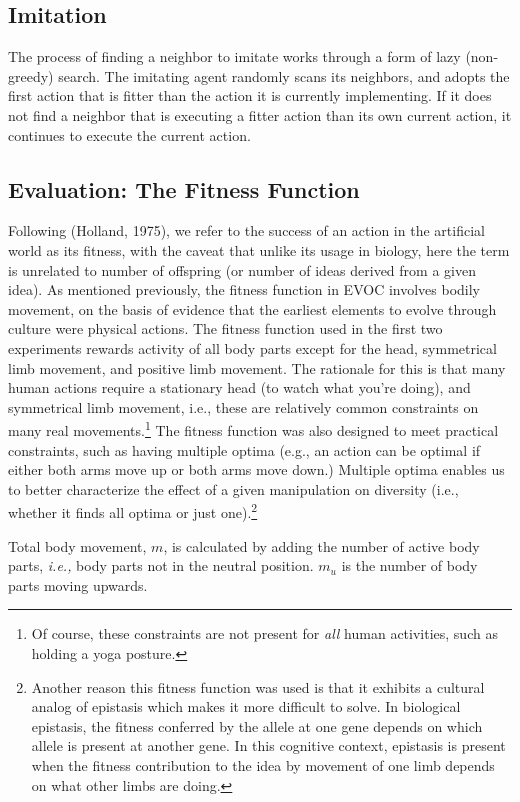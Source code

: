\documentclass[a4paper,12pt,man,british]{apa6}
\begin{document}
\subsection{Imitation}
The process of finding a neighbor to imitate works through a form of lazy (non-greedy) search. The imitating agent randomly scans its neighbors, and adopts the first action that is fitter than the action it is currently implementing. If it does not find a neighbor that is executing a fitter action than its own current action, it continues to execute the current action.

\subsection{Evaluation: The Fitness Function}
Following (Holland, 1975), we refer to the success of an action in the artificial world as its fitness, with the caveat that unlike its usage in biology, here the term is unrelated to number of offspring (or number of ideas derived from a given idea). As mentioned previously, the fitness function in EVOC involves bodily movement, on the basis of evidence that the earliest elements to evolve through culture were physical actions. The fitness function used in the first two experiments rewards activity of all body parts except for the head, symmetrical limb movement, and positive limb movement. The rationale for this is that many human actions require a stationary head (to watch what you're doing), and symmetrical limb movement, i.e., these are relatively common constraints on many real movements.\footnote{Of course, these constraints are not present for {\it all} human activities, such as holding a yoga posture.}
The fitness function was also designed to meet practical constraints, such as having multiple optima (e.g., an action can be optimal if either both arms move up or both arms move down.) Multiple optima enables us to better characterize the effect of a given manipulation on diversity (i.e., whether it finds all optima or just one).\footnote{Another reason this fitness function was used is that it exhibits a cultural analog of epistasis which makes it more difficult to solve. In biological epistasis, the fitness conferred by the allele at one gene depends on which allele is present at another gene. In this cognitive context, epistasis is present when the fitness contribution to the idea by movement of one limb depends on what other limbs are doing.}

Total body movement, $m$, is calculated by adding the number of active body parts, \emph{i.e.,} body parts not in the neutral position. $m_u$ is the number of body parts moving upwards.\\
\end{document}

